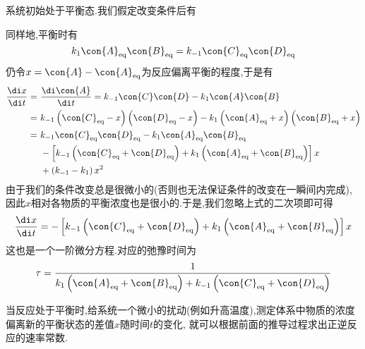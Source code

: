 \documentclass{ctexart}
\begin{document}
\begin{derivation}
    系统初始处于平衡态.我们假定改变条件后有
    \begin{tightcenter}
    \end{tightcenter}
    同样地,平衡时有
    \[k_1\con{A}_{\text{eq}}\con{B}_{\text{eq}}=k_{-1}\con{C}_{\text{eq}}\con{D}_{\text{eq}}\]
    仍令$x=\con{A}-\con{A}_{\text{eq}}$为反应偏离平衡的程度,于是有
    \[\begin{aligned}
        \dfrac{\di x}{\di t}
        = &\ \dfrac{\di\con{A}}{\di t} = k_{-1}\con{C}\con{D}-k_1\con{A}\con{B} \\
        = &\ k_{-1}\left(\con{C}_{\text{eq}}-x\right)\left(\con{D}_{\text{eq}}-x\right)-k_1\left(\con{A}_{\text{eq}}+x\right)\left(\con{B}_{\text{eq}}+x\right) \\
        = &\ k_{-1}\con{C}_{\text{eq}}\con{D}_{\text{eq}}-k_1\con{A}_{\text{eq}}\con{B}_{\text{eq}} \\
          &\ -\left[k_{-1}\left(\con{C}_{\text{eq}}+\con{D}_{\text{eq}}\right)+k_1\left(\con{A}_{\text{eq}}+\con{B}_{\text{eq}}\right)\right]x \\
          &\ +\left(k_{-1}-k_1\right)x^2
    \end{aligned}\]
    由于我们的条件改变总是很微小的(否则也无法保证条件的改变在一瞬间内完成),因此$x$相对各物质的平衡浓度也是很小的.于是,我们忽略上式的二次项即可得
    \[\dfrac{\di x}{\di t}=-\left[k_{-1}\left(\con{C}_{\text{eq}}+\con{D}_{\text{eq}}\right)+k_1\left(\con{A}_{\text{eq}}+\con{B}_{\text{eq}}\right)\right]x\]
    这也是一个一阶微分方程.对应的弛豫时间为
    \[\tau=\dfrac{1}{k_1\left(\con{A}_{\text{eq}}+\con{B}_{\text{eq}}\right)+k_{-1}\left(\con{C}_{\text{eq}}+\con{D}_{\text{eq}}\right)}\]

\end{derivation}
\begin{theorem}[7E.3.2 弛豫法测定速率常数]
    当反应处于平衡时,给系统一个微小的扰动(例如升高温度),测定体系中物质的浓度偏离新的平衡状态的差值$x$随时间$t$的变化,%
    就可以根据前面的推导过程求出正逆反应的速率常数.
\end{theorem}
\end{document}

